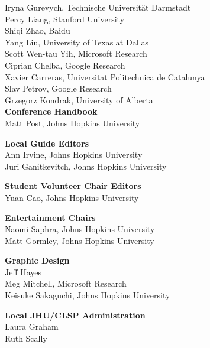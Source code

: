 Iryna Gurevych, Technische Universität Darmstadt  \\
Percy Liang, Stanford University  \\
Shiqi Zhao, Baidu  \\
Yang Liu, University of Texas at Dallas  \\
Scott Wen-tau Yih, Microsoft Research  \\
Ciprian Chelba, Google Research  \\
Xavier Carreras, Universitat Politechnica de Catalunya  \\
Slav Petrov, Google Research  \\
Grzegorz Kondrak, University of Alberta  \\

{\bf Conference Handbook} \\
Matt Post, Johns Hopkins University \\

{\bf Local Guide Editors} \\
Ann Irvine, Johns Hopkins University \\
Juri Ganitkevitch, Johns Hopkins University \\

{\bf Student Volunteer Chair Editors} \\
Yuan Cao, Johns Hopkins University \\

{\bf Entertainment Chairs} \\
Naomi Saphra, Johns Hopkins University\\
Matt Gormley, Johns Hopkins University\\

{\bf Graphic Design} \\
Jeff Hayes\\
Meg Mitchell, Microsoft Research\\
Keisuke Sakaguchi, Johns Hopkins University\\

{\bf Local JHU/CLSP Administration} \\
Laura Graham\\
Ruth Scally\\
